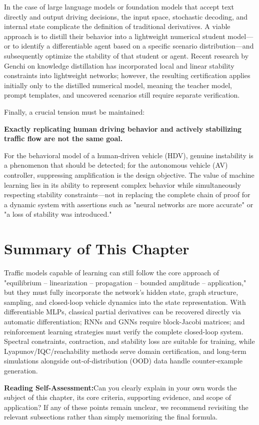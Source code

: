 \documentclass[11pt,a4paper,openany]{book}
\numberwithin{equation}{chapter}
\numberwithin{figure}{chapter}
\numberwithin{table}{chapter}
\newcommand{\sectionwrapup}[1]{%
  \section{Summary of This Chapter}
  \begin{tcolorbox}[summarybox,title=\textbf{Chapter Review}]
  #1
  \par\smallskip
  \textbf{Reading Self-Assessment:}Can you clearly explain in your own words the subject of this chapter, its core criteria, supporting evidence, and scope of application? If any of these points remain unclear, we recommend revisiting the relevant subsections rather than simply memorizing the final formula.
\end{tcolorbox}
  \clearpage
}
\begin{document}
In the case of large language models or foundation models that accept text directly and output driving decisions, the input space, stochastic decoding, and internal state complicate the definition of traditional derivatives. A viable approach is to distill their behavior into a lightweight numerical student model—or to identify a differentiable agent based on a specific scenario distribution—and subsequently optimize the stability of that student or agent. Recent research by Genchi on knowledge distillation has incorporated local and linear stability constraints into lightweight networks; however, the resulting certification applies initially only to the distilled numerical model, meaning the teacher model, prompt templates, and uncovered scenarios still require separate verification.




Finally, a crucial tension must be maintained:






\textbf{Exactly replicating human driving behavior and actively stabilizing traffic flow are not the same goal.}






For the behavioral model of a human-driven vehicle (HDV), genuine instability is a phenomenon that should be detected; for the autonomous vehicle (AV) controller, suppressing amplification is the design objective. The value of machine learning lies in its ability to represent complex behavior while simultaneously respecting stability constraints—not in replacing the complete chain of proof for a dynamic system with assertions such as "neural networks are more accurate" or "a loss of stability was introduced."
\sectionwrapup{Traffic models capable of learning can still follow the core approach of "equilibrium – linearization – propagation – bounded amplitude – application," but they must fully incorporate the network's hidden state, graph structure, sampling, and closed-loop vehicle dynamics into the state representation. With differentiable MLPs, classical partial derivatives can be recovered directly via automatic differentiation; RNNs and GNNs require block-Jacobi matrices; and reinforcement learning strategies must verify the complete closed-loop system. Spectral constraints, contraction, and stability loss are suitable for training, while Lyapunov/IQC/reachability methods serve domain certification, and long-term simulations alongside out-of-distribution (OOD) data handle counter-example generation.}
\end{document}
